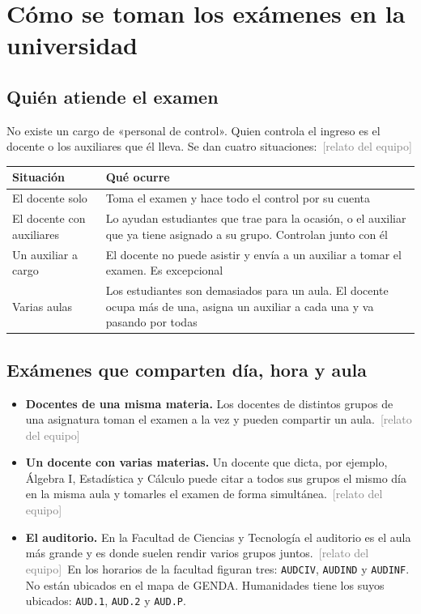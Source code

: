 \documentclass[11pt,letterpaper]{article}
\newcommand{\relatado}{\textcolor{gray}{\footnotesize\,[relato del equipo]}}
\begin{document}
\section{Cómo se toman los exámenes en la universidad}

\subsection{Quién atiende el examen}

No existe un cargo de «personal de control». Quien controla el ingreso es el docente o
los auxiliares que él lleva. Se dan cuatro situaciones: \relatado

\begin{center}
\begin{tabular}{@{}L{4.6cm}L{11.2cm}@{}}
\hline
\textbf{Situación} & \textbf{Qué ocurre} \\
\hline
El docente solo & Toma el examen y hace todo el control por su cuenta \\
El docente con auxiliares & Lo ayudan estudiantes que trae para la ocasión, o el auxiliar que ya tiene asignado a su grupo. Controlan junto con él \\
Un auxiliar a cargo & El docente no puede asistir y envía a un auxiliar a tomar el examen. Es excepcional \\
Varias aulas & Los estudiantes son demasiados para un aula. El docente ocupa más de una, asigna un auxiliar a cada una y va pasando por todas \\
\hline
\end{tabular}
\end{center}

\subsection{Exámenes que comparten día, hora y aula}

\begin{itemize}
  \item \textbf{Docentes de una misma materia.} Los docentes de distintos grupos de una
        asignatura toman el examen a la vez y pueden compartir un aula. \relatado
  \item \textbf{Un docente con varias materias.} Un docente que dicta, por ejemplo,
        Álgebra I, Estadística y Cálculo puede citar a todos sus grupos el mismo día en la
        misma aula y tomarles el examen de forma simultánea. \relatado
  \item \textbf{El auditorio.} En la Facultad de Ciencias y Tecnología el auditorio es el
        aula más grande y es donde suelen rendir varios grupos juntos. \relatado\ En los
        horarios de la facultad figuran tres: \texttt{AUDCIV}, \texttt{AUDIND} y
        \texttt{AUDINF}. No están ubicados en el mapa de GENDA. Humanidades tiene los
        suyos ubicados: \texttt{AUD.1}, \texttt{AUD.2} y \texttt{AUD.P}.
\end{itemize}
\end{document}
